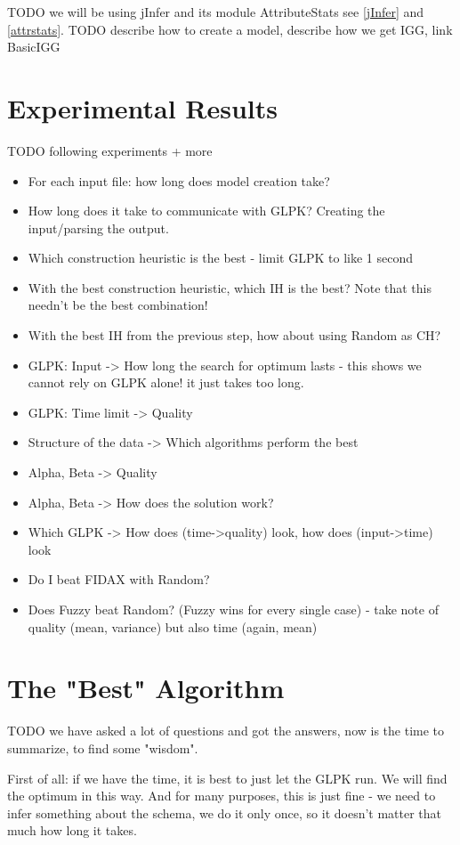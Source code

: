 \documentclass[a4paper,12pt,oneside]{report}
\begin{document}
TODO we will be using jInfer and its module AttributeStats see \ref{jInfer} and \ref{attrstats}.
TODO describe how to create a model, describe how we get IGG, link BasicIGG

\section{Experimental Results}

TODO following experiments + more

\begin{itemize}
	\item For each input file: how long does model creation take?
	\item How long does it take to communicate with GLPK? Creating the input/parsing the output.
	\item Which construction heuristic is the best - limit GLPK to like 1 second
	\item With the best construction heuristic, which IH is the best? Note that this needn't be the best combination!
	\item With the best IH from the previous step, how about using Random as CH?
	\item GLPK: Input -> How long the search for optimum lasts - this shows we cannot rely on GLPK alone! it just takes too long.
	\item GLPK: Time limit -> Quality
	\item Structure of the data -> Which algorithms perform the best
	\item Alpha, Beta -> Quality
	\item Alpha, Beta -> How does the solution work?
	\item Which GLPK -> How does (time->quality) look, how does (input->time) look
	\item Do I beat FIDAX with Random?
	\item Does Fuzzy beat Random? (Fuzzy wins for every single case) - take note of quality (mean, variance) but also time (again, mean)
\end{itemize}

\section{The "Best" Algorithm}

TODO we have asked a lot of questions and got the answers, now is the time to summarize, to find some "wisdom".

First of all: if we have the time, it is best to just let the GLPK run. 
We will find the optimum in this way. 
And for many purposes, this is just fine - we need to infer something about the schema, we do it only once, so it doesn't matter that much how long it takes.
\end{document}
